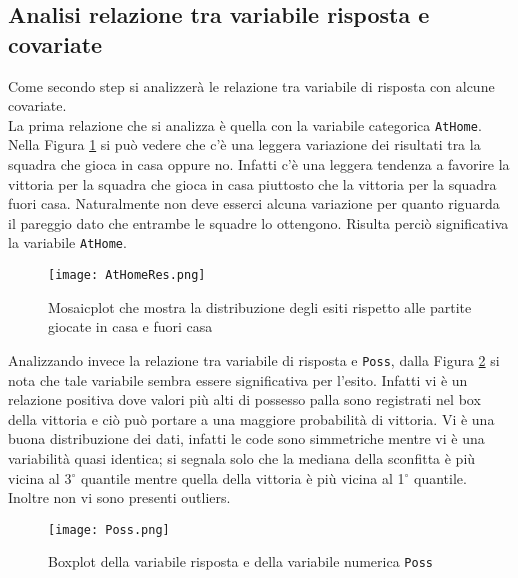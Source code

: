 \subsection{Analisi relazione tra variabile risposta e covariate}
Come secondo step si analizzerà le relazione tra variabile di risposta con alcune covariate.\\

La prima relazione che si analizza è quella con la variabile categorica \texttt{AtHome}. Nella Figura \ref{fig:AtHome} si può vedere che c'è una leggera variazione dei risultati tra la squadra che gioca in casa oppure no. Infatti c'è una leggera tendenza a favorire la vittoria per la squadra che gioca in casa piuttosto che la vittoria per la squadra fuori casa. Naturalmente non deve esserci alcuna variazione per quanto riguarda il pareggio dato che entrambe le squadre lo ottengono. Risulta perciò significativa la variabile \texttt{AtHome}.\\

\begin{figure}[htbp]
	\begin{center}
		\texttt{[image: AtHomeRes.png]}
		\caption{Mosaicplot che mostra la distribuzione degli esiti rispetto alle partite giocate in casa e fuori casa} \label{fig:AtHome}
	\end{center}
\end{figure}

Analizzando invece la relazione tra variabile di risposta e \texttt{Poss}, dalla Figura \ref{fig:Poss} si nota che tale variabile sembra essere significativa per l'esito. Infatti vi è un relazione positiva dove valori più alti di possesso palla sono registrati nel box della vittoria e ciò può portare a una maggiore probabilità di vittoria. Vi è una buona distribuzione dei dati, infatti le code sono simmetriche mentre vi è una variabilità quasi identica; si segnala solo che la mediana della sconfitta è più vicina al 3$^{\circ}$ quantile mentre quella della vittoria è più vicina al 1$^{\circ}$ quantile. Inoltre non vi sono presenti outliers.

\begin{figure}[htbp]
	\begin{center}
		\texttt{[image: Poss.png]}
		\caption{Boxplot della variabile risposta e della variabile numerica \texttt{Poss} } \label{fig:Poss}
	\end{center}
\end{figure}

